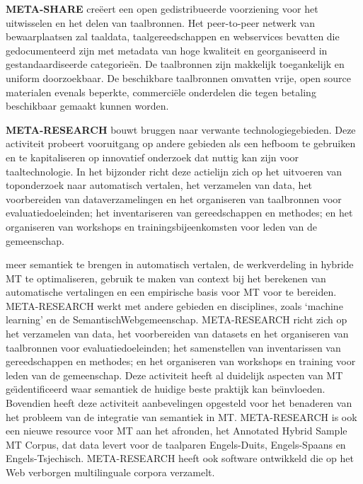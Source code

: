 \begin{multicols}{2}
    
    \textbf{META-SHARE} cre{\"e}ert een open gedistribueerde voorziening voor het uitwisselen en het delen van taalbronnen. Het peer-to-peer netwerk van bewaarplaatsen zal taaldata, taalgereedschappen en webservices bevatten die gedocumenteerd zijn met metadata van hoge kwaliteit en georganiseerd in gestandaardiseerde categorie{\"e}n. De taalbronnen zijn makkelijk toegankelijk en uniform doorzoekbaar. De beschikbare taalbronnen omvatten vrije, open source materialen evenals beperkte, commerci{\"e}le onderdelen die tegen betaling beschikbaar gemaakt kunnen worden.
    
    \textbf{META-RESEARCH} bouwt bruggen naar verwante technologiegebieden. Deze activiteit probeert vooruitgang op andere gebieden als een hefboom te gebruiken en te kapitaliseren op innovatief onderzoek dat nuttig kan zijn voor taaltechnologie. In het bijzonder richt deze actielijn zich op het uitvoeren van  toponderzoek naar automatisch vertalen, het verzamelen van  data, het voorbereiden van dataverzamelingen en het organiseren van taalbronnen voor evaluatiedoeleinden; het inventariseren van gereedschappen en methodes; en het organiseren van workshops en trainingsbijeenkomsten voor leden van de gemeenschap.
    
    
    
    meer semantiek te brengen in automatisch vertalen, de werkverdeling in hybride MT te optimaliseren, gebruik te maken van context bij het berekenen van automatische vertalingen en een empirische basis voor MT voor te bereiden. META-RESEARCH werkt met andere gebieden en disciplines, zoals `machine learning' en de SemantischWebgemeenschap. META-RESEARCH richt zich op het verzamelen van data, het voorbereiden van datasets en het organiseren van taalbronnen voor evaluatiedoeleinden; het samenstellen van inventarissen van gereedschappen en methodes; en het organiseren van workshops en training voor leden van de gemeenschap. Deze activiteit heeft al duidelijk aspecten van MT ge{\"\i}dentificeerd waar semantiek de huidige beste praktijk kan be{\"\i}nvloeden. Bovendien heeft deze activiteit aanbevelingen opgesteld voor het benaderen van het probleem van de integratie van semantiek in MT. META-RESEARCH is ook een nieuwe resource voor MT aan het afronden, het Annotated Hybrid Sample MT Corpus, dat data levert voor de taalparen Engels-Duits, Engels-Spaans en Engels-Tsjechisch. META-RESEARCH heeft ook software ontwikkeld die op het Web verborgen multilinguale corpora verzamelt.

\end{multicols}

